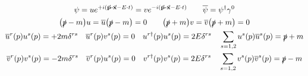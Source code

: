 \begin{gather*}
        \psi
        = ue^{+i\qty(\va{p}\vdot\va{x} - E\cdot t)}
        = ve^{-i\qty(\va{p}\vdot\va{x} - E\cdot t)}
        \qquad
        \overline{\psi} = \psi^\dagger\gamma^0
        \\
        \qty(\slashed{p}-m)u
        = \overline{u}\qty(\slashed{p}-m)
        = 0
        \qquad
        \qty(\slashed{p}+m)v
        = \overline{v}\qty(\slashed{p}+m)
        = 0
        \\
        \overline{u}^r(p)u^s(p) = +2m\delta^{rs}
        \quad
        \overline{u}^r(p)v^s(p) = 0
        \quad
        u^{r\dagger}(p)u^s(p) = 2E\delta^{rs}
        \quad
        \sum_{s=1,2}u^s(p)\overline{u}^s(p) = \slashed{p} + m
        \\
        \overline{v}^r(p)v^s(p) = -2m\delta^{rs}
        \quad
        \overline{v}^r(p)u^s(p) = 0
        \quad
        v^{r\dagger}(p)v^s(p) = 2E\delta^{rs}
        \quad
        \sum_{s=1,2}v^s(p)\overline{v}^s(p) = \slashed{p} - m
\end{gather*}
